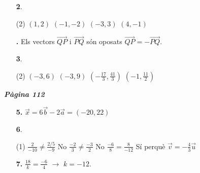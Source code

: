 \documentclass[a4paper, pdf, twoside]{book}
\begin{document}
\begin{multicols}{2}
\begin{enumerate}

 \item[\fontfamily{phv}\selectfont\color{blue}\textbf{2}. ] 
 \begin{tasks}[column-sep=1em, item-indent=1.3333em](2)
	 \task $(1,2)$
	 \task $(-1,-2)$
	 \task $(-3,3)$
	 \task $(4,-1)$
\end{tasks}
\vspace{0.25cm}
\item[\fontfamily{phv}\selectfont\color{blue}\textbf{. }] 
Els vectors $\overrightarrow {QP}$ i $\overrightarrow {PQ}$ són oposats $\overrightarrow {QP}=-\overrightarrow {PQ}$.
\vspace{0.25cm}



 \item[\fontfamily{phv}\selectfont\color{blue}\textbf{3}. ] 
 \begin{tasks}[column-sep=1em, item-indent=1.3333em](2)
	 \task $(-3,6)$
	 \task $(-3,9)$
	 \task $(-\frac {17}{3},\frac {41}{3})$
	 \task $(-1,\frac {11}{2})$
\end{tasks}
 \end{enumerate}
\vspace{0.3cm}


{\textbf{\em Pàgina 112}} \hrulefill
\begin{enumerate}
\vspace{0.25cm}
\item[\fontfamily{phv}\selectfont\color{blue}\textbf{5. }] 
$\vec x = 6 \vec b - 2 \vec a = ( -20, 22 )$
 \end{enumerate}
\begin{enumerate}
\vspace{0.25cm}



 \item[\fontfamily{phv}\selectfont\color{blue}\textbf{6}. ] 
 \begin{tasks}[column-sep=1em, item-indent=1.3333em](1)
	 \task* $\frac {2}{-10} \neq \frac {2/5}{-9}$ No
	 \task* $\frac {-2}{3} \neq \frac {-3}{2}$ No
	 \task* $\frac {-6}{8} = \frac {8}{-12}$ Sí perquè $\vec v = -\frac {4}{3}\vec u$
\end{tasks}
\vspace{0.25cm}
\item[\fontfamily{phv}\selectfont\color{blue}\textbf{7. }] 
$\frac {18}{k} = \frac {-6}{4}$ $\rightarrow $ $k=-12$.
 \end{enumerate}
\vspace{0.3cm}


\end{multicols}
\end{document}
